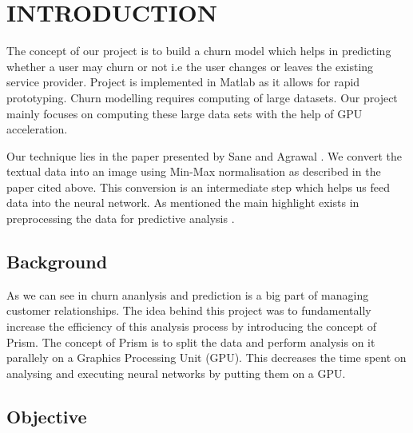 

\chapter{INTRODUCTION}

\hspace{0.9cm} The concept of our project is to build a churn model which helps in predicting whether a user may churn or not i.e the user changes or leaves the existing service provider. Project is implemented in Matlab as it allows for rapid prototyping. Churn modelling requires computing of large datasets. Our project mainly focuses on computing these large data sets with the help of GPU acceleration.

Our technique lies in the paper presented by Sane and Agrawal \cite{citation-8}. We convert the textual data into an image using Min-Max normalisation as described in the paper cited above. This conversion is an intermediate step which helps us feed data into the neural network. As mentioned the main highlight exists in preprocessing the data for predictive analysis \cite{citation-1}.




\section{Background}

\hspace{0.9cm} As we can see in \cite{citation-1} churn ananlysis and prediction is a big part of managing customer relationships. The idea behind this project was to fundamentally increase the efficiency of this analysis process by introducing the concept of Prism. The concept of Prism is to split the data and perform analysis on it parallely on a Graphics Processing Unit (GPU). This decreases the time spent on analysing and executing neural networks by putting them on a GPU.

\section{Objective}


